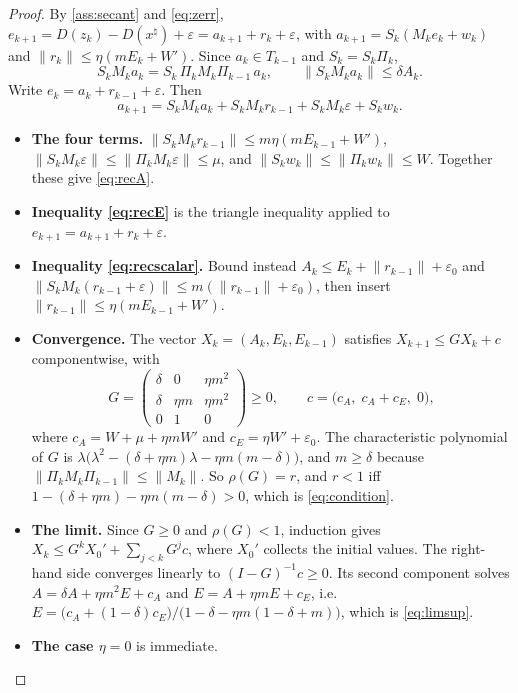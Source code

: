 \documentclass[11pt]{article}
\theoremstyle{definition}
\theoremstyle{remark}
\newcommand{\norm}[1]{\lVert #1\rVert}
\newcommand{\xt}{x^\natural}
\begin{document}
\begin{proof}
By \cref{ass:secant} and \eqref{eq:zerr},
$e_{k+1}=D(z_k)-D(\xt)+\varepsilon=a_{k+1}+r_k+\varepsilon$, with $a_{k+1}=S_k(M_ke_k+w_k)$ and
$\norm{r_k}\leq\eta(m E_k+W')$. Since $a_k\in T_{k-1}$ and $S_k=S_k\Pi_k$,
\[
S_kM_ka_k=S_k\,\Pi_kM_k\Pi_{k-1}\,a_k,\qquad \norm{S_kM_ka_k}\leq\delta A_k .
\]
Write $e_k=a_k+r_{k-1}+\varepsilon$. Then
\[
a_{k+1}=S_kM_ka_k+S_kM_kr_{k-1}+S_kM_k\varepsilon+S_kw_k .
\]
\begin{itemize}
\item \textbf{The four terms.} $\norm{S_kM_kr_{k-1}}\leq m\eta(mE_{k-1}+W')$, $\norm{S_kM_k\varepsilon}\leq\norm{\Pi_kM_k\varepsilon}\leq\mu$,
  and $\norm{S_kw_k}\leq\norm{\Pi_kw_k}\leq W$. Together these give \eqref{eq:recA}.
\item \textbf{Inequality \eqref{eq:recE}} is the triangle inequality applied to $e_{k+1}=a_{k+1}+r_k+\varepsilon$.
\item \textbf{Inequality \eqref{eq:recscalar}.} Bound instead $A_k\leq E_k+\norm{r_{k-1}}+\varepsilon_0$ and
  $\norm{S_kM_k(r_{k-1}+\varepsilon)}\leq m(\norm{r_{k-1}}+\varepsilon_0)$, then insert
  $\norm{r_{k-1}}\leq\eta(mE_{k-1}+W')$.
\item \textbf{Convergence.} The vector $X_k=(A_k,E_k,E_{k-1})$ satisfies $X_{k+1}\leq GX_k+c$ componentwise, with
  \[
  G=\begin{pmatrix}\delta&0&\eta m^2\\\delta&\eta m&\eta m^2\\0&1&0\end{pmatrix}\geq0,\qquad c=\big(c_A,\;c_A+c_E,\;0\big),
  \]
  where $c_A=W+\mu+\eta mW'$ and $c_E=\eta W'+\varepsilon_0$. The characteristic polynomial of $G$ is
  $\lambda\big(\lambda^2-(\delta+\eta m)\lambda-\eta m(m-\delta)\big)$, and $m\geq\delta$ because
  $\norm{\Pi_kM_k\Pi_{k-1}}\leq\norm{M_k}$. So $\rho(G)=r$, and $r<1$ iff
  $1-(\delta+\eta m)-\eta m(m-\delta)>0$, which is \eqref{eq:condition}.
\item \textbf{The limit.} Since $G\geq0$ and $\rho(G)<1$, induction gives $X_k\leq G^kX_0'+\sum_{j<k}G^jc$, where
  $X_0'$ collects the initial values. The right-hand side converges linearly to $(I-G)^{-1}c\geq0$. Its second
  component solves $A=\delta A+\eta m^2E+c_A$ and $E=A+\eta mE+c_E$, i.e.
  $E=\big(c_A+(1-\delta)c_E\big)/\big(1-\delta-\eta m(1-\delta+m)\big)$, which is \eqref{eq:limsup}.
\item \textbf{The case $\eta=0$} is immediate.
\end{itemize}
\end{proof}
\end{document}
